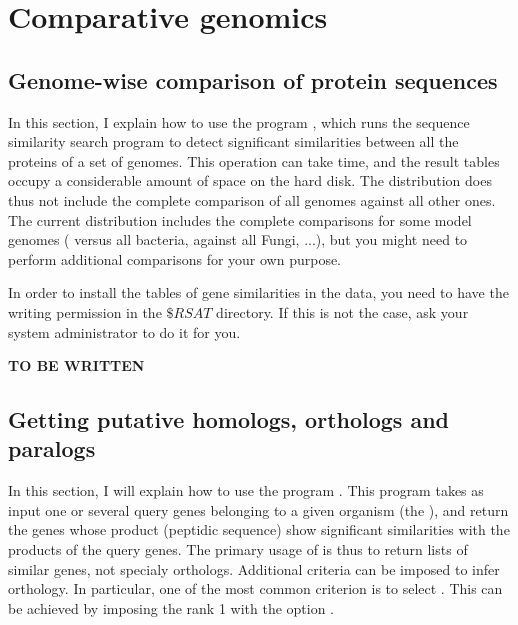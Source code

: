 \chapter{Comparative genomics}

\section{Genome-wise comparison of protein sequences}

In this section, I explain how to use the program
, which runs the sequence similarity search
program  to detect significant similarities between all
the proteins of a set of genomes. This operation can take time, and
the result tables occupy a considerable amount of space on the hard
disk. The \RSAT distribution does thus not include the complete
comparison of all genomes against all other ones. The current \RSAT
distribution includes the complete comparisons for some model genomes
( versus all bacteria,
 against all Fungi, ...), but you
might need to perform additional comparisons for your own purpose.

In order to install the tables of gene similarities in the \RSAT data,
you need to have the writing permission in the $\$RSAT$ directory. If
this is not the case, ask your system administrator to do it for you.

\textbf{TO BE WRITTEN}

\section{Getting putative homologs, orthologs and paralogs}

In this section, I will explain how to use the program
. This program takes as input one or several
query genes belonging to a given organism (the ), and return the genes whose product (peptidic sequence)
show significant similarities with the products of the query
genes. The primary usage of  is thus to return
lists of similar genes, not specialy orthologs. Additional criteria
can be imposed to infer orthology.  In particular, one of the most
common criterion is to select . This can be achieved by imposing the rank 1 with the option
.

